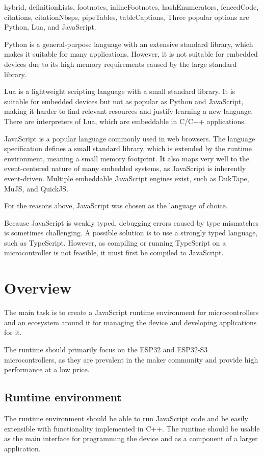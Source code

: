 \documentclass[
  digital,
  oneside,
  nosansbold,
  nocolorbold,
  lof,
  lot
]{fithesis4}
\begin{document}
\begin{markdown*}{%
  hybrid,
  definitionLists,
  footnotes,
  inlineFootnotes,
  hashEnumerators,
  fencedCode,
  citations,
  citationNbsps,
  pipeTables,
  tableCaptions,
}
Three popular options are Python, Lua, and JavaScript.

Python is a general-purpose language with an extensive standard library, which makes it suitable for many applications. However, it is not suitable for embedded devices due to its high memory requirements caused by the large standard library.

Lua is a lightweight scripting language with a small standard library. It is suitable for embedded devices but not as popular as Python and JavaScript, making it harder to find relevant resources and justify learning a new language. There are interpreters of Lua, which are embeddable in C/C++ applications.

JavaScript is a popular language commonly used in web browsers. The language specification defines a small standard library, which is extended by the runtime environment, meaning a small memory footprint. It also maps very well to the event-centered nature of many embedded systems, as JavaScript is inherently event-driven. Multiple embeddable JavaScript engines exist, such as DukTape, MuJS, and QuickJS.

For the reasons above, JavaScript was chosen as the language of choice.

Because JavaScript is weakly typed, debugging errors caused by type mismatches is sometimes challenging. A possible solution is to use a strongly typed language, such as TypeScript. However, as compiling or running TypeScript on a microcontroller is not feasible, it must first be compiled to JavaScript.


\chapter{Overview}

The main task is to create a JavaScript runtime environment for microcontrollers and an ecosystem around it for managing the device and developing applications for it.

The runtime should primarily focus on the ESP32 and ESP32-S3 microcontrollers, as they are prevalent in the maker community and provide high performance at a low price.


\section{Runtime environment}

The runtime environment should be able to run JavaScript code and be easily extensible with functionality implemented in C++. The runtime should be usable as the main interface for programming the device and as a component of a larger application.


\end{markdown*}
\end{document}
